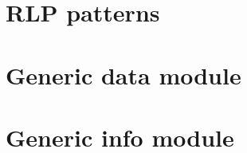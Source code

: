 \documentclass[fleqn]{report}
\begin{document}
\chapter{RLP patterns}                               \label{chap: RLP patterns}    \minitoc    
\chapter{Generic data module}                        \label{chap: generic data}    \minitoc    
\chapter{Generic info module}                        \label{chap: generic info}    \minitoc    

\nocite{*}

\printbibliography %
\end{document}
